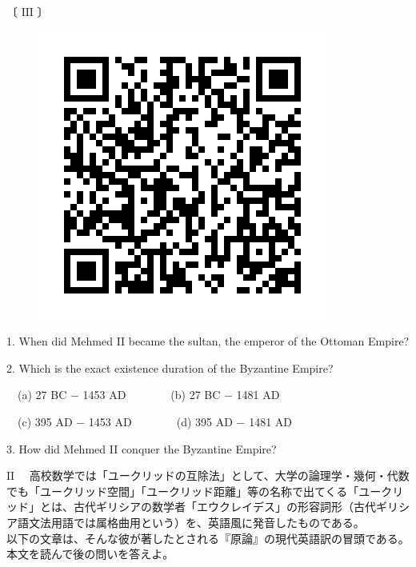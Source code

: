 \documentclass[12pt,a4paper,dvipdfmx]{jarticle}
\begin{document}
\begin{spacing}{1.5}

〔 $\mathrm{III}$ 〕

\vspace{3mm}
\begin{figure}[H]
\centering
\includegraphics[scale=0.2]{mehmed.jpeg}
\end{figure}
\vspace{-1mm}

1. When did Mehmed II became the sultan, the emperor of the Ottoman Empire?

\vspace{2mm}

  2. Which is the exact existence duration of the Byzantine Empire?

　(a) 27 BC $-$ 1453 AD　　\hspace{2mm}　　(b) 27 BC $-$ 1481 AD

　(c) 395 AD $-$ 1453 AD　　　　(d) 395 AD $-$ 1481 AD

\vspace{2mm}

  3. How did Mehmed II conquer the Byzantine Empire?


\newpage


  {\Large\textbf{$\mathrm{II}$}} 　高校数学では「ユークリッドの互除法」として、大学の論理学・幾何・代数でも「ユークリッド空間」「ユークリッド距離」等の名称で出てくる「ユークリッド」とは、古代ギリシアの数学者「エウクレイデス」の形容詞形（古代ギリシア語文法用語では属格曲用という）を、英語風に発音したものである。\\
  以下の文章は、そんな彼が著したとされる『原論』の現代英語訳の冒頭である。本文を読んで後の問いを答えよ。


\end{spacing}
\end{document}

